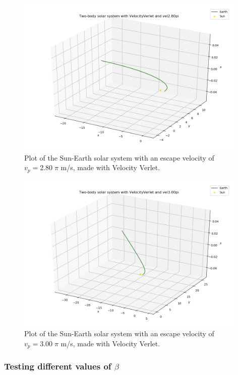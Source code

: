 \documentclass{article}
\begin{document}
    \begin{figure}[H]
        \centering
        \includegraphics[width = 11cm]{img/plot3D_S_E_V_vel280pi.png}
        \caption{Plot of the Sun-Earth solar system with an escape velocity of $v_p = 2.80 \; \pi$ m/s, made with Velocity Verlet. }
        \label{fig:plot3D_S_E_V_vel280pi}
    \end{figure}

    \begin{figure}[H]
        \centering
        \includegraphics[width = 11cm]{img/plot3D_S_E_V_vel300pi.png}
        \caption{Plot of the Sun-Earth solar system with an escape velocity of $v_p = 3.00 \; \pi$ m/s, made with Velocity Verlet. }
        \label{fig:plot3D_S_E_V_vel300pi}
    \end{figure}

\subsubsection{Testing different values of \texorpdfstring{$\beta$}{TEXT}}
\end{document}
